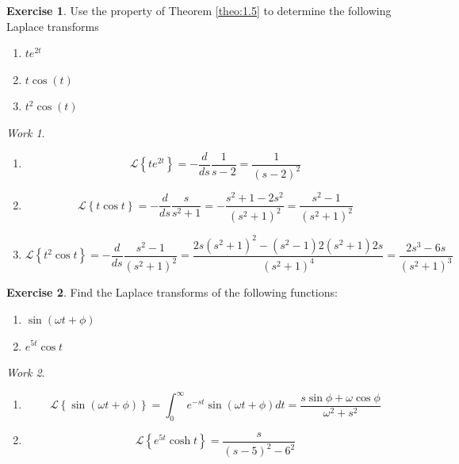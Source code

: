 \documentclass{report}
\theoremstyle{definition}
\newtheorem{exercise}{Exercise}[chapter]
\theoremstyle{remark}
\newtheorem*{work}{Work}
\newcommand{\lapt}[1]{\mathscr{L}\left\{ #1\right\}}
\newcommand{\od}[2]{\frac{d #1}{d#2}}
\begin{document}
\begin{exercise}
    Use the property of Theorem \ref{theo:1.5} to determine the following Laplace transforms
    \begin{enumerate} [label=(\alph*)]
        \item $te^{2t}$ 
        \item $t\cos (t)$ 
        \item $t^2 \cos (t)$
    \end{enumerate}
\end{exercise}
\begin{work}
\leavevmode
    \begin{enumerate} [label=(\alph*)]
        \item \begin{equation*}
            \lapt{te^{2t}}=-\od{}{s} \frac{1}{s-2} = \frac{1}{(s-2)^2}
        \end{equation*}
        \item \begin{equation*}
            \lapt{t\cos t} =-\od{}{s} \frac{s}{s^2+1} = -\frac{s^2+1-2s^2}{(s^2+1)^2} = \frac{s^2-1}{(s^2+1)^2}
        \end{equation*}
        \item \begin{equation*}
            \lapt{t^2\cos t}=-\od{}{s} \frac{s^2-1}{(s^2+1)^2} = \frac{2s(s^2+1)^2-(s^2-1)2(s^2+1)2s}{(s^2+1)^4} = \frac{2s^3-6s}{(s^2+1)^3}
        \end{equation*}
    \end{enumerate}
\end{work}

\begin{exercise}
    Find the Laplace transforms of the following functions:
    \begin{enumerate} [label =(\alph*)]
        \item $\sin(\omega t+\phi)$\\
        \item $e^{5t}\cos t$
    \end{enumerate}
\end{exercise}
\begin{work}
\leavevmode
    \begin{enumerate} [label=(\alph*)]
        \item \begin{equation*}
            \lapt{\sin(\omega t+\phi)} = \int^\infty_0 e^{-st}\sin (\omega t+\phi)dt =\frac{s\sin\phi+\omega \cos \phi}{\omega^2+s^2}
        \end{equation*}
        \item \begin{equation*}
            \lapt{e^{5t}\cosh t} = \frac{s}{(s-5)^2-6^2}
        \end{equation*}
    \end{enumerate}
\end{work}
\end{document}
